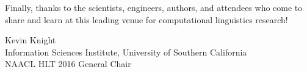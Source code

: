 \newpage 

Finally, thanks to the scientists, engineers, authors, and attendees who
come to share and learn at this leading venue for computational
linguistics research!

\vskip 0.3in
\noindent Kevin Knight\\
Information Sciences Institute, University of Southern California\\
NAACL HLT 2016 General Chair

